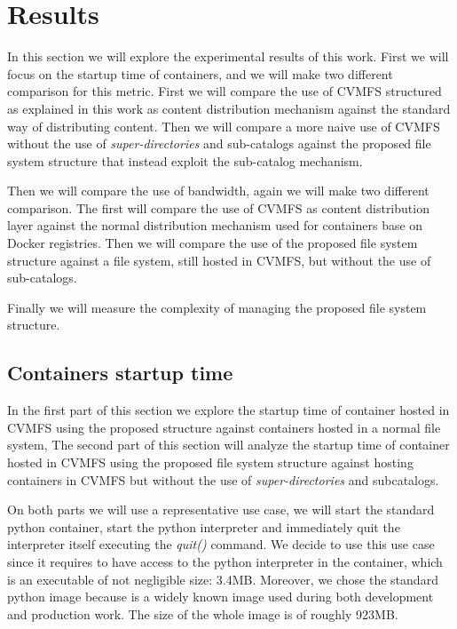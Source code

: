 \chapter{Results}\label{ch:Results}

In this section we will explore the experimental results of this work. First we
will focus on the startup time of containers, and we will make two different
comparison for this metric. First we will compare the use of CVMFS structured
as explained in this work as content distribution mechanism against the
standard way of distributing content. Then we will compare a more naive use of
CVMFS without the use of \textit{super-directories} and sub-catalogs against
the proposed file system structure that instead exploit the sub-catalog
mechanism. 

Then we will compare the use of bandwidth, again we will make two different
comparison. The first will compare the use of CVMFS as content distribution
layer against the normal distribution mechanism used for containers base on
Docker registries. Then we will compare the use of the proposed file system
structure against a file system, still hosted in CVMFS, but without the use of
sub-catalogs. 

Finally we will measure the complexity of managing the proposed file system
structure.

\section{Containers startup time}

In the first part of this section we explore the startup time of container
hosted in CVMFS using the proposed structure against containers hosted in a
normal file system, The second part of this section will analyze the startup
time of container hosted in CVMFS using the proposed file system structure
against hosting containers in CVMFS but without the use of
\textit{super-directories} and subcatalogs.

On both parts we will use a representative use case, we will start the standard
python container, start the python interpreter and immediately quit the
interpreter itself executing the \textit{quit()} command. We decide to use this
use case since it requires to have access to the python interpreter in the
container, which is an executable of not negligible size: 3.4MB. Moreover, we 
chose the standard python image because is a widely known image used during both
development and production work. The size of the whole image is of roughly 923MB.

